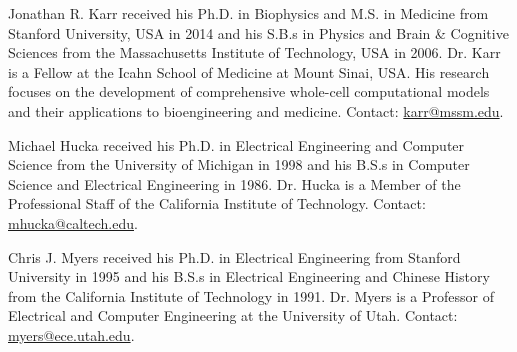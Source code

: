 \documentclass[journal,transmag]{IEEEtran}
\begin{document}
\begin{IEEEbiography}{Jonathan R. Karr}
received his Ph.D. in Biophysics and M.S. in Medicine from Stanford University, USA in 2014 and his S.B.s in Physics and Brain \& Cognitive Sciences from the Massachusetts Institute of Technology, USA in 2006. 
Dr. Karr is a Fellow at the Icahn School of Medicine at Mount Sinai, USA. 
His research focuses on the development of comprehensive whole-cell computational models and their applications to bioengineering and medicine. 
Contact: \href{mailto:karr@mssm.edu}{karr@mssm.edu}.
\end{IEEEbiography}

\begin{IEEEbiography}{Michael Hucka}
received his Ph.D. in Electrical Engineering and Computer Science from the University of Michigan in 1998 and his B.S.s in Computer Science and Electrical Engineering in 1986.
Dr. Hucka is a Member of the Professional Staff of the California Institute of Technology.
Contact: \href{mailto:mhucka@caltech.edu}{mhucka@caltech.edu}.
\end{IEEEbiography}

\begin{IEEEbiography}{Chris J. Myers}
received his Ph.D. in Electrical Engineering from Stanford University in 1995 and his B.S.s in Electrical Engineering and Chinese History from the California Institute of Technology in 1991.
Dr. Myers is a Professor of Electrical and Computer Engineering at the University of Utah.
Contact: \href{mailto:myers@ece.utah.edu}{myers@ece.utah.edu}.
\end{IEEEbiography}
\end{document}
